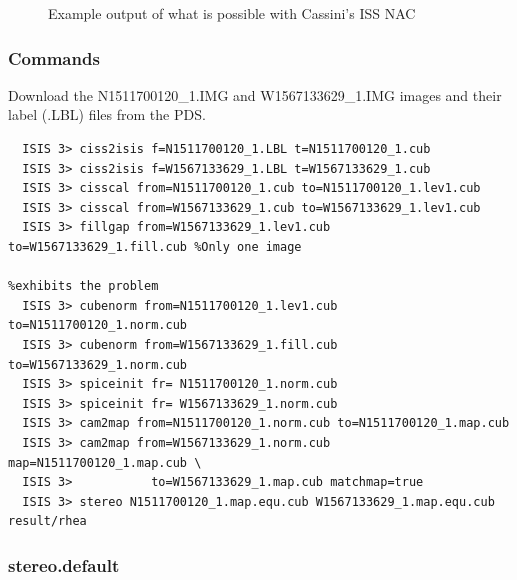 \begin{figure}[p]
  \hfil
\caption{Example output of what is possible with Cassini's ISS NAC}
\label{fig:cassini-exampe}
\end{figure}

\subsubsection*{Commands}

Download the N1511700120\_1.IMG and W1567133629\_1.IMG images and their label (.LBL) files from the \ac{PDS}.
\begin{verbatim}
  ISIS 3> ciss2isis f=N1511700120_1.LBL t=N1511700120_1.cub
  ISIS 3> ciss2isis f=W1567133629_1.LBL t=W1567133629_1.cub
  ISIS 3> cisscal from=N1511700120_1.cub to=N1511700120_1.lev1.cub
  ISIS 3> cisscal from=W1567133629_1.cub to=W1567133629_1.lev1.cub
  ISIS 3> fillgap from=W1567133629_1.lev1.cub to=W1567133629_1.fill.cub %Only one image
                                                                        %exhibits the problem
  ISIS 3> cubenorm from=N1511700120_1.lev1.cub to=N1511700120_1.norm.cub
  ISIS 3> cubenorm from=W1567133629_1.fill.cub to=W1567133629_1.norm.cub
  ISIS 3> spiceinit fr= N1511700120_1.norm.cub
  ISIS 3> spiceinit fr= W1567133629_1.norm.cub
  ISIS 3> cam2map from=N1511700120_1.norm.cub to=N1511700120_1.map.cub
  ISIS 3> cam2map from=W1567133629_1.norm.cub map=N1511700120_1.map.cub \
  ISIS 3>           to=W1567133629_1.map.cub matchmap=true
  ISIS 3> stereo N1511700120_1.map.equ.cub W1567133629_1.map.equ.cub result/rhea
\end{verbatim}

\subsubsection*{stereo.default}

